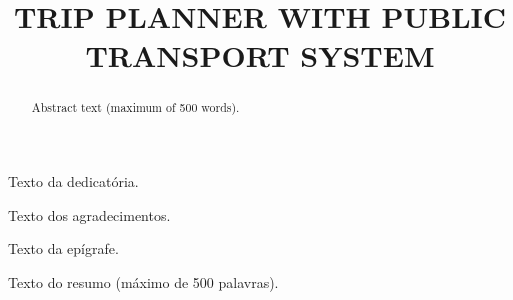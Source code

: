 \documentclass[openright]{normas-utf-tex} %
\title{\MakeUppercase{Trip Planner with Public Transport System}} %
\begin{document}
\capa %
\folhaderosto %

\begin{dedicatoria}
Texto da dedicat\'oria.
\end{dedicatoria}

\begin{agradecimentos}
Texto dos agradecimentos.
\end{agradecimentos}

\begin{epigrafe}
Texto da ep\'igrafe.
\end{epigrafe}

\begin{resumo}
Texto do resumo (m\'aximo de 500 palavras).
\end{resumo}

\begin{abstract}
Abstract text (maximum of 500 words).
\end{abstract}

\listadefiguras %
\listadetabelas %
\listadesiglas %
\listadesimbolos %

\sumario %



\sloppy














\end{document}
